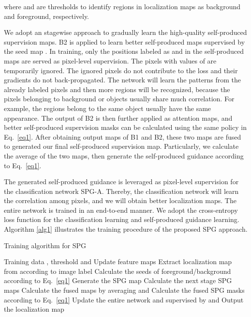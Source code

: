 \documentclass[runningheads]{llncs}
\begin{document}
where  and  are thresholds to identify regions in localization maps as background and foreground, respectively.

We adopt an stagewise approach to gradually learn the high-quality self-produced supervision maps.
B2 is applied to learn better self-produced maps supervised by the seed map .
In training, only the positions labeled as  and  in the self-produced maps are served as pixel-level supervision.
The pixels with values of  are temporarily ignored. The ignored pixels do not contribute to the loss and their gradients do not back-propagated.
The network will learn the patterns from the already labeled pixels and then more regions will be recognized,
because the pixels belonging to background or objects usually share much correlation.
For example, the regions belong to the same object usually have the same appearance.
The output of B2 is then further applied as attention maps, and better self-produced supervision masks can be calculated using the same policy in Eq.~\eqref{eq1}.
After obtaining output maps of B1 and B2, these two maps are fused to generated our final self-produced supervision map. Particularly, we calculate the average of the two maps, then generate the self-produced guidance  according to Eq.~\eqref{eq1}.

The generated self-produced guidance is leveraged as pixel-level supervision for the classification network SPG-A.
Thereby, the classification network will learn the correlation among pixels, and we will obtain better localization maps.
The entire network is trained in an end-to-end manner.
We adopt the cross-entropy loss function for the classification learning and self-produced guidance learning.
Algorithm \ref{alg1} illustrates the training procedure of the proposed SPG approach.

\begin{algorithm}
\small
\caption{Training algorithm for SPG}
\label{alg1}
\begin{algorithmic}[1]
\INPUT Training data , threshold  and 
\STATE Update feature maps 
\STATE Extract localization map  from  according to image label 
\STATE Calculate the seeds of foreground/background  according to Eq.~\eqref{eq1}
\STATE Generate the SPG map 
\STATE Calculate the next stage SPG maps 
\STATE Calculate the fused maps  by averaging  and 
\STATE Calculate the fused SPG masks  according to Eq.~\eqref{eq1}
\STATE Update the entire network  and  supervised by  and 
\ENDWHILE
\OUTPUT Output the localization map 
\end{algorithmic}
\end{algorithm}
\end{document}
